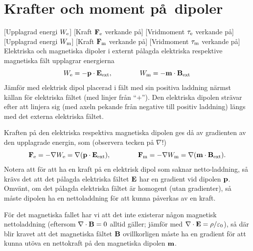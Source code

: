 {{{{{\section{Krafter och moment p{\aa}\ dipoler}
[Upplagrad energi $W_{\rm e}$]
[Kraft ${\bf F}_{\rm e}$ verkande p{\aa}]
[Vridmoment $\tau_{\rm e}$ verkande p{\aa}]
[Upplagrad energi $W_{\rm m}$]
[Kraft ${\bf F}_{\rm m}$ verkande p{\aa}]
[Vridmoment $\tau_{\rm m}$ verkande p{\aa}]
Elektriska och magnetiska dipoler i externt p{\aa}lagda elektriska respektive
magnetiska f{\"a}lt upplagrar energierna
$$
  W_{\rm e} = -{\bf p}\cdot{\bf E}_{\rm ext},\qquad\qquad
  W_{\rm m} = -{\bf m}\cdot{\bf B}_{\rm ext}
$$
J{\"a}mf{\"o}r med elektrisk dipol placerad i f{\"a}lt med sin positiva
laddning n{\"a}rmst k{\"a}llan f{\"o}r elektriska f{\"a}ltet (med linjer
fr{\aa}n ``$+$''). Den elektriska dipolen str{\"a}var efter att linjera sig
(med axeln pekande fr{\aa}n negative till positiv laddning) l{\"a}ngs med
det externa elektriska f{\"a}ltet.

Kraften p{\aa} den elektriska respektiva magnetiska dipolen ges d{\aa} av
gradienten av den upplagrade energin, som (observera tecken p{\aa} $\nabla$!)%
$$
  {\bf F}_{\rm e} = -\nabla W_{\rm e}
    =\nabla({\bf p}\cdot{\bf E}_{\rm ext}),\qquad\qquad
  {\bf F}_{\rm m} = -\nabla W_{\rm m}
    =\nabla({\bf m}\cdot{\bf B}_{\rm ext}).
$$
Notera att f{\"o}r att ha en kraft p{\aa} en elektrisk dipol som saknar
netto-laddning, s{\aa} kr{\"a}vs det att det p{\aa}lagda elektriska f{\"a}ltet
${\bf E}$ har en gradient vid dipolen ${\bf p}$. Omv{\"a}nt, om det p{\aa}lagda
elektriska f{\"a}ltet {\"a}r homogent (utan gradienter), s{\aa} m{\aa}ste
dipolen ha en nettoladdning f{\"o}r att kunna p{\aa}verkas av en kraft.

F{\"o}r det magnetiska fallet har vi att det inte existerar n{\aa}gon magnetisk
nettoladdning (eftersom $\nabla\cdot{\bf B}=0$ alltid g{\"a}ller;
j{\"a}mf{\"o}r med $\nabla\cdot{\bf E}=\rho/\varepsilon_0$), s{\aa} d{\"a}r
blir kravet att det magnetiska f{\"a}ltet ${\bf B}$ ovillkorligen m{\aa}ste ha
en gradient f{\"o}r att kunna ut{\"o}va en nettokraft p{\aa} den magnetiska
dipolen ${\bf m}$.

}}}}}
